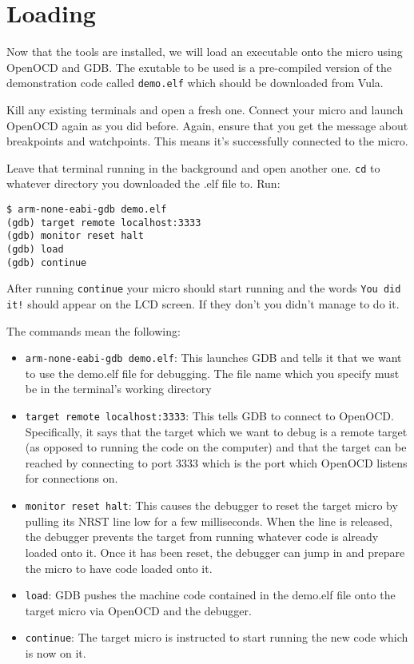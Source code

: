 \chapter{Loading}
Now that the tools are installed, we will load an executable onto the micro using OpenOCD and GDB. The exutable to be used is a pre-compiled version of the demonstration code called \texttt{demo.elf} which should be downloaded from Vula.

Kill any existing terminals and open a fresh one. Connect your micro and launch OpenOCD again as you did before. Again, ensure that you get the message about breakpoints and watchpoints. This means it's successfully connected to the micro.

Leave that terminal running in the background and open another one. \texttt{cd} to whatever directory you downloaded the .elf file to. Run:
\begin{lstlisting}[style=BashStyle]
$ arm-none-eabi-gdb demo.elf
(gdb) target remote localhost:3333
(gdb) monitor reset halt
(gdb) load
(gdb) continue
\end{lstlisting}
After running \texttt{continue} your micro should start running and the words \texttt{You did it!} should appear on the LCD screen. If they don't you didn't manage to do it.

The commands mean the following:
\begin{itemize}
\item \texttt{arm-none-eabi-gdb demo.elf}: This launches GDB and tells it that we want to use the demo.elf file for debugging. The file name which you specify must be in the terminal's working directory
\item \texttt{target remote localhost:3333}: This tells GDB to connect to OpenOCD. Specifically, it says that the target which we want to debug is a remote target (as opposed to running the code on the computer) and that the target can be reached by connecting to port 3333 which is the port which OpenOCD listens for connections on.
\item \texttt{monitor reset halt}: This causes the debugger to reset the target micro by pulling its NRST line low for a few milliseconds. When the line is released, the debugger prevents the target from running whatever code is already loaded onto it. Once it has been reset, the debugger can jump in and prepare the micro to have code loaded onto it.
\item \texttt{load}: GDB pushes the machine code contained in the demo.elf file onto the target micro via OpenOCD and the debugger.
\item \texttt{continue}: The target micro is instructed to start running the new code which is now on it.
\end{itemize}


